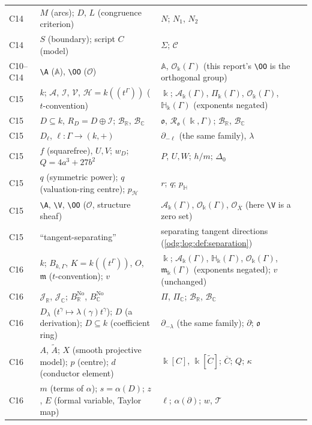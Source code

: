 \documentclass[11pt,oneside]{article}
\numberwithin{equation}{section}
\theoremstyle{definition}
\theoremstyle{remark}
\newcommand{\R}{\mathbb R}
\newcommand{\C}{\mathbb C}
\newcommand{\BR}{\mathcal B_{\R}}
\newcommand{\BC}{\mathcal B_{\C}}
\newcommand{\crH}{\mathbb H_\Bbbk(\Gamma)}
\newcommand{\crA}{\mathcal A_\Bbbk(\Gamma)}
\newcommand{\crP}{\Pi_\Bbbk(\Gamma)}
\newcommand{\crO}{\mathcal O_\Bbbk(\Gamma)}
\newcommand{\crm}{\mathfrak m_\Bbbk(\Gamma)}
\newcommand{\Aff}{\mathbb A}
\begin{document}
\begin{longtable}{>{\raggedright\arraybackslash}p{}>{\raggedright\arraybackslash}p{}>{\raggedright\arraybackslash}p{}}
C14 & $M$ (arcs); $D$, $L$ (congruence criterion) & $N$; $N_1$, $N_2$\\
C14 & $S$ (boundary); script $C$ (model) & $\Sigma$; $\mathcal C$\\
C10--C14 & \texttt{\textbackslash A} ($\mathbb A$), \texttt{\textbackslash OO}
($\mathcal O$) & $\Aff$, $\crO$ (this report's \texttt{\textbackslash OO} is the
orthogonal group)\\
C15 & $k$; $\mathcal A$, $\mathcal I$, $\mathcal V$, $\mathcal H=k((t^\Gamma))$
($t$-convention) & $\Bbbk$; $\crA$, $\crP$, $\crO$, $\crH$ (exponents negated)\\
C15 & $D\subseteq k$, $R_D=D\oplus\mathcal I$; $\mathcal B_{\R}$, $\mathcal B_{\C}$ &
$\mathfrak o$, $\mathcal R_{\mathfrak o}(\Bbbk,\Gamma)$; $\BR$, $\BC$\\
C15 & $D_\ell$, $\ell:\Gamma\to(k,+)$ & $\partial_{-\ell}$ (the same family), $\lambda$\\
C15 & $f$ (squarefree), $U,V$; $w_D$; $Q=4a^3+27b^2$ & $P$, $U,W$; $h/m$; $\Delta_0$\\
C15 & $q$ (symmetric power); $q$ (valuation-ring centre); $p_{\mathcal H}$ & $r$; $q$;
$p_{\mathbb H}$\\
C15 & \texttt{\textbackslash A}, \texttt{\textbackslash V}, \texttt{\textbackslash OO}
($\mathcal O$, structure sheaf) & $\crA$, $\crO$, $\mathcal O_{\overline X}$ (here
\texttt{\textbackslash V} is a zero set)\\
C15 & ``tangent-separating'' & separating tangent directions
(\cref{odg:log:def:separation})\\
C16 & $k$; $B_{k,\Gamma}$, $K=k((t^\Gamma))$, $O$, $\mathfrak m$ ($t$-convention); $v$ &
$\Bbbk$; $\crA$, $\crH$, $\crO$, $\crm$ (exponents negated); $v$ (unchanged)\\
C16 & $\mathcal J_\R$, $\mathcal J_\C$; $B^{\mathrm{No}}_\R$, $B^{\mathrm{No}}_\C$ &
$\Pi$, $\Pi_{\C}$; $\BR$, $\BC$\\
C16 & $D_\lambda$ ($t^\gamma\mapsto\lambda(\gamma)t^\gamma$); $D$ (a derivation); $D\subseteq k$
(coefficient ring) & $\partial_{-\lambda}$ (the same family); $\partial$; $\mathfrak o$\\
C16 & $A$, $\widetilde A$; $X$ (smooth projective model); $p$ (centre); $d$ (conductor
element) & $\Bbbk[C]$, $\Bbbk[\widetilde C]$; $\overline C$; $Q$; $\kappa$\\
C16 & $m$ (terms of $\alpha$); $s=\alpha(D)$; $z$, $E$ (formal variable, Taylor map) &
$\ell$; $\alpha(\partial)$; $w$, $\mathcal T$\\

\end{longtable}
\end{document}
